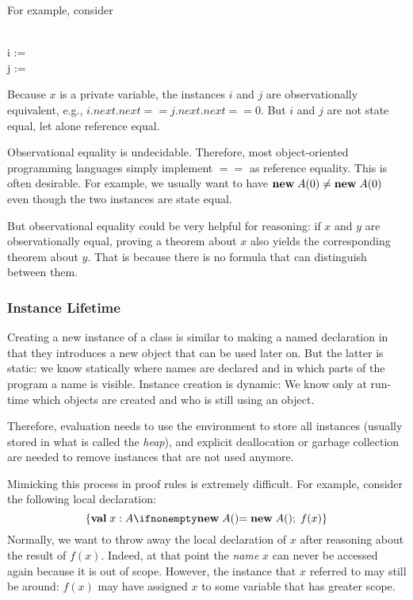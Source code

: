 For example, consider
\begin{acode}
\\
i := \\
j := 
\end{acode}
Because $x$ is a private variable, the instances $i$ and $j$ are observationally equivalent, e.g., $i.next.next == j.next.next == 0$.
But $i$ and $j$ are not state equal, let alone reference equal.

Observational equality is undecidable.
Therefore, most object-oriented programming languages simply implement $==$ as reference equality.
This is often desirable.
For example, we usually want to have ${\rm \bf new}\; A(0)\neq {\rm \bf new}\; A(0)$ even though the two instances are state equal.

But observational equality could be very helpful for reasoning: if $x$ and $y$ are observationally equal, proving a theorem about $x$ also yields the corresponding theorem about $y$.
That is because there is no formula that can distinguish between them.

\subsubsection{Instance Lifetime}

Creating a new instance of a class is similar to making a named declaration in that they introduces a new object that can be used later on.
But the latter is static: we know statically where names are declared and in which parts of the program a name is visible.
Instance creation is dynamic: We know only at run-time which objects are created and who is still using an object.

Therefore, evaluation needs to use the environment to store all instances (usually stored in what is called the \emph{heap}), and explicit deallocation or garbage collection are needed to remove instances that are not used anymore.

Mimicking this process in proof rules is extremely difficult.
For example, consider the following local declaration:
\[\{\aval{x}{A}{\anew{A}{}} ;\; f(x)\}\]
Normally, we want to throw away the local declaration of $x$ after reasoning about the result of $f(x)$.
Indeed, at that point the \emph{name} $x$ can never be accessed again because it is out of scope.
However, the instance that $x$ referred to may still be around: $f(x)$ may have assigned $x$ to some variable that has greater scope.

